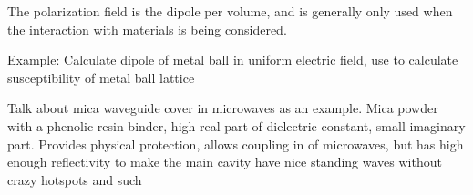 \documentclass[12pt,a4paper,violet]{bbe}
\begin{document}
	The polarization field is the dipole per volume, and is generally only used when the interaction with materials is being considered.
	
	Example: Calculate dipole of metal ball in uniform electric field, use to calculate susceptibility of metal ball lattice
	


	Talk about mica waveguide cover in microwaves as an example. Mica powder with a phenolic resin binder, high real part of dielectric constant, small imaginary part.
	Provides physical protection, allows coupling in of microwaves, but has high enough reflectivity to make the main cavity have nice standing waves without crazy hotspots and such
	

	\blinddocument
	
\end{document}

